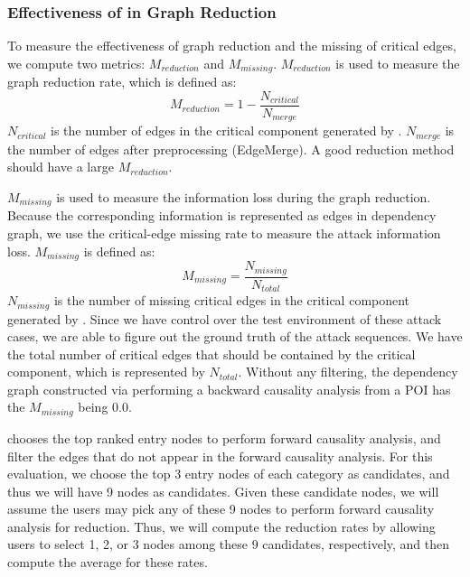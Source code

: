 

\subsubsection{Effectiveness of \tool in Graph Reduction}
\label{subsec:reductionAndMissing}

To measure the effectiveness of graph reduction and the missing of critical edges, we compute two metrics: $M_{reduction}$ and $M_{missing}$. $M_{reduction}$ is used to measure the graph reduction rate, which is defined as:
\begin{equation}
    M_{reduction} = 1- \frac{N_{critical}}{N_{merge}}
\end{equation}
$N_{critical}$ is the number of edges in the critical component generated by \tool. $N_{merge}$ is the number of edges after preprocessing (\ie EdgeMerge). 
A good reduction method should have a large $M_{reduction}$.

$M_{missing}$ is used to measure the information loss during the graph reduction. 
Because the corresponding information is represented as edges in dependency graph, we use the critical-edge missing rate to measure the attack information loss. 
$M_{missing}$ is defined as:
\begin{equation}
    M_{missing} = \frac{N_{missing}}{N_{total}}
\end{equation}
$N_{missing}$ is the number of missing critical edges in the critical component generated by \tool. Since we have control over the test environment of these attack cases, we are able to figure out the ground truth of the attack sequences. 
We have the total number of critical edges that should be contained by the critical component, which is represented by $N_{total}$.
Without any filtering, the dependency graph constructed via performing a backward causality analysis from a POI has the $M_{missing}$ being $0.0$.



\tool chooses the top ranked entry nodes to perform forward causality analysis, and filter the edges that do not appear in the forward causality analysis. 
For this evaluation, we choose the top 3 entry nodes of each category as candidates, and thus we will have 9 nodes as candidates. 
Given these candidate nodes, we will assume the users may pick any of these 9 nodes to perform forward causality analysis for reduction.
Thus, we will compute the reduction rates by allowing users to select 1, 2, or 3 nodes among these 9 candidates, respectively, and then compute the average for these rates.


